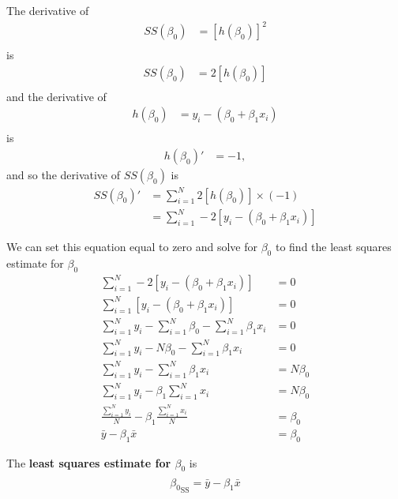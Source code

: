 The derivative of 
\begin{align}
    SS(\beta_{0}) &= \left[ h(\beta_{0}) \right]^{2} \\
\end{align}
is 
\begin{align}
    SS(\beta_{0}) &= 2\left[ h(\beta_{0}) \right] \\
\end{align} and the derivative of 
\begin{align}
    h(\beta_{0}) &= y_{i} - \left(\beta_{0} + \beta_{1}x_{i} \right) \\
\end{align}
is 
\begin{align}
    h(\beta_{0})' &= - 1,
\end{align}
and so the derivative of $SS(\beta_{0})$ is 
\begin{align}
    SS(\beta_{0})' &= \sum_{i=1}^{N} 2\left[ h(\beta_{0}) \right] \times (-1) \\ 
                   &= \sum_{i=1}^{N} -2\left[y_{i} - \left(\beta_{0} + \beta_{1}x_{i} \right) \right]
\end{align}

We can set this equation equal to zero and solve for $\beta_{0}$ to find the least squares estimate for $\beta_{0}$
\begin{align}
    \sum_{i=1}^{N} -2\left[y_{i} - \left(\beta_{0} + \beta_{1}x_{i} \right) \right] &=0 \\ 
    \sum_{i=1}^{N} \left[y_{i} - \left(\beta_{0} + \beta_{1}x_{i} \right) \right] &=0 \\
    \sum_{i=1}^{N} y_{i} - \sum_{i=1}^{N} \beta_{0} -\sum_{i=1}^{N} \beta_{1}x_{i}  &=0 \\
    \sum_{i=1}^{N} y_{i} - N \beta_{0} -\sum_{i=1}^{N} \beta_{1}x_{i}  &=0 \\
    \sum_{i=1}^{N} y_{i}  -\sum_{i=1}^{N} \beta_{1}x_{i}  &= N \beta_{0} \\
    \sum_{i=1}^{N} y_{i}  - \beta_{1}\sum_{i=1}^{N} x_{i}  &= N \beta_{0} \\
    \frac{\sum_{i=1}^{N} y_{i}}{N}  - \beta_{1}\frac{\sum_{i=1}^{N}x_{i}}{N}  &=  \beta_{0}\\
    \bar{y} - \beta_{1}\bar{x}  &=  \beta_{0}
\end{align}

The \textbf{least squares estimate for $\beta_{0}$} is 
\begin{align}
    \hat{\beta_{0}}_{\text{SS}} = \bar{y} - \beta_{1} \bar{x}
\end{align}

